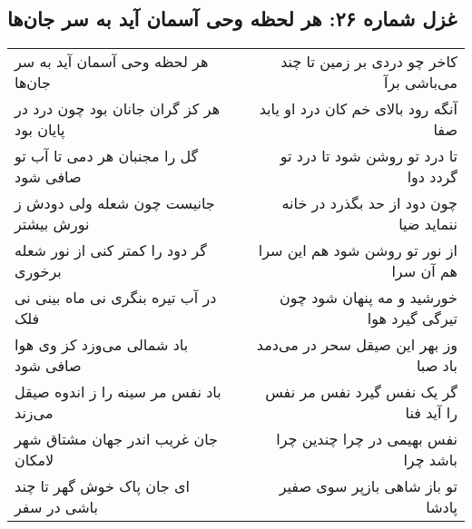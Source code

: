 \begin{center}
\section*{غزل شماره ۲۶: هر لحظه وحی آسمان آید به سر جان‌ها}
\label{sec:0026}
\begin{longtable}{l p{0.5cm} r}
هر لحظه وحی آسمان آید به سر جان‌ها
&&
کاخر چو دردی بر زمین تا چند می‌باشی برآ
\\
هر کز گران جانان بود چون درد در پایان بود
&&
آنگه رود بالای خم کان درد او یابد صفا
\\
گل را مجنبان هر دمی تا آب تو صافی شود
&&
تا درد تو روشن شود تا درد تو گردد دوا
\\
جانیست چون شعله ولی دودش ز نورش بیشتر
&&
چون دود از حد بگذرد در خانه ننماید ضیا
\\
گر دود را کمتر کنی از نور شعله برخوری
&&
از نور تو روشن شود هم این سرا هم آن سرا
\\
در آب تیره بنگری نی ماه بینی نی فلک
&&
خورشید و مه پنهان شود چون تیرگی گیرد هوا
\\
باد شمالی می‌وزد کز وی هوا صافی شود
&&
وز بهر این صیقل سحر در می‌دمد باد صبا
\\
باد نفس مر سینه را ز اندوه صیقل می‌زند
&&
گر یک نفس گیرد نفس مر نفس را آید فنا
\\
جان غریب اندر جهان مشتاق شهر لامکان
&&
نفس بهیمی در چرا چندین چرا باشد چرا
\\
ای جان پاک خوش گهر تا چند باشی در سفر
&&
تو باز شاهی بازپر سوی صفیر پادشا
\\
\end{longtable}
\end{center}
